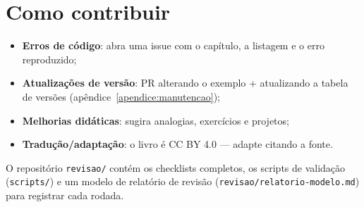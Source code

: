 \section{Como contribuir}

\begin{itemize}[leftmargin=*, itemsep=0.4em]
  \item \textbf{Erros de código}: abra uma issue com o capítulo, a listagem e
  o erro reproduzido;
  \item \textbf{Atualizações de versão}: PR alterando o exemplo + atualizando
  a tabela de versões (apêndice~\ref{apendice:manutencao});
  \item \textbf{Melhorias didáticas}: sugira analogias, exercícios e projetos;
  \item \textbf{Tradução/adaptação}: o livro é CC BY 4.0 — adapte citando a fonte.
\end{itemize}

\begin{caixadica}
O repositório \texttt{revisao/} contém os checklists completos, os scripts de
validação (\texttt{scripts/}) e um modelo de relatório de revisão
(\texttt{revisao/relatorio-modelo.md}) para registrar cada rodada.
\end{caixadica}
